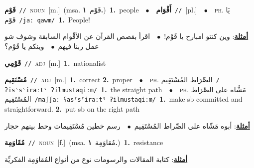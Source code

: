 \documentclass[10pt,a4paper,twoside]{article} %
\begin{document}
\begin{multicols}{2}
{\setlength\topsep{0pt}\textbf{\foreignlanguage{arabic}{قَوْم}}\ {\color{gray}\texttt{//}\color{black}}\ \textsc{noun}\ [m.]\ \color{gray}(msa. \foreignlanguage{arabic}{قَوْم}~\foreignlanguage{arabic}{\textbf{١.}})\color{black}\ \textbf{1.}~people\ \ $\bullet$\ \ \setlength\topsep{0pt}\textbf{\foreignlanguage{arabic}{أَقْوَام}}\ {\color{gray}\texttt{//}\color{black}}\ [pl.]\ \ $\bullet$\ \ \textsc{ph.} \color{gray} \foreignlanguage{arabic}{يَا قَوْم}\color{black}\ {\color{gray}\texttt{/{\sffamily jaː qawm}/}\color{black}}\ \textbf{1.}~People!\  \begin{flushright}\color{gray}\foreignlanguage{arabic}{\textbf{\underline{\foreignlanguage{arabic}{أمثلة}}}: وين كنتو امبارح يا قَوْم!\ $\bullet$\ \  اقرأ بقصص القرآن عن الأقْوام السابقة وشوف شو عمل ربنا فيهم\ $\bullet$\ \  وينكم يا قَوْم؟}\end{flushright}\color{black}} \vspace{2mm}

{\setlength\topsep{0pt}\textbf{\foreignlanguage{arabic}{قَوْمِي}}\ {\color{gray}\texttt{//}\color{black}}\ \textsc{adj}\ [m.]\ \textbf{1.}~nationalist\ } \vspace{2mm}

{\setlength\topsep{0pt}\textbf{\foreignlanguage{arabic}{مُسْتَقِيم}}\ {\color{gray}\texttt{//}\color{black}}\ \textsc{adj}\ [m.]\ \textbf{1.}~correct  \textbf{2.}~proper\ \ $\bullet$\ \ \textsc{ph.} \color{gray} \foreignlanguage{arabic}{الصِّرَاط المُسْتَقِيم}\color{black}\ {\color{gray}\texttt{/{\sffamily ʔisˤsˤiraːtˤ ʔilmustaqiːm}/}\color{black}}\ \textbf{1.}~the straight path\ \ $\bullet$\ \ \textsc{ph.} \color{gray} \foreignlanguage{arabic}{مَشَّاه على الصِّرَاط المُسْتَقِيم}\color{black}\ {\color{gray}\texttt{/{\sffamily maʃʃaː ʕasˤsˤiraːtˤ ʔilmustaqiːm}/}\color{black}}\ \textbf{1.}~make sb committed and straightforward.  \textbf{2.}~put sb on the right path\  \begin{flushright}\color{gray}\foreignlanguage{arabic}{\textbf{\underline{\foreignlanguage{arabic}{أمثلة}}}: أبوه مَشّاه على الصِّراط المُسْتَقِيم\ $\bullet$\ \  رسم خطين مُسْتَقِيمات وحط بينهم حجار}\end{flushright}\color{black}} \vspace{2mm}

{\setlength\topsep{0pt}\textbf{\foreignlanguage{arabic}{مُقَاوَمِة}}\ {\color{gray}\texttt{//}\color{black}}\ \textsc{noun}\ [f.]\ \color{gray}(msa. \foreignlanguage{arabic}{مُقاوَمِة}~\foreignlanguage{arabic}{\textbf{١.}})\color{black}\ \textbf{1.}~resistance\  \begin{flushright}\color{gray}\foreignlanguage{arabic}{\textbf{\underline{\foreignlanguage{arabic}{أمثلة}}}: كتابة المقالات والرسومات نوع من أنواع المُقاوَمِة الفكريِّة}\end{flushright}\color{black}} \vspace{2mm}


\end{multicols}
\end{document}
